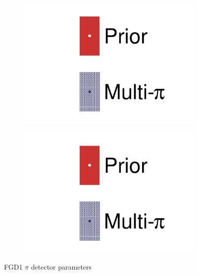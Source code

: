 \begin{figure}[h]
	\begin{subfigure}[t]{0.32\textwidth}
		\includegraphics[width=\textwidth,page=44, trim={0mm 0mm 0mm 0mm}, clip]{figures/mach3/2018/data/2018a_FixedCov_RedCov_Mpi_Data_merge_drawPar_withDet}
	\end{subfigure}
	\begin{subfigure}[t]{0.32\textwidth}
		\includegraphics[width=\textwidth,page=45, trim={0mm 0mm 0mm 0mm}, clip]{figures/mach3/2018/data/2018a_FixedCov_RedCov_Mpi_Data_merge_drawPar_withDet}
	\end{subfigure}
	\caption{FGD1 $\pi$ detector parameters}
	\label{fig:data_multipi_det_fdg1_cc0pi_nubar}
\end{figure}

